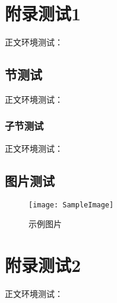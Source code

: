 \chapter{附录测试1}
正文环境测试：\sampletext

\section{节测试}
正文环境测试：\sampletext

\subsection{子节测试}
正文环境测试：\sampletext

\section{图片测试}
\begin{figure}[h]
    \centering
    \texttt{[image: SampleImage]}
    \caption{示例图片}
\end{figure}

\chapter{附录测试2}
正文环境测试：\sampletext
